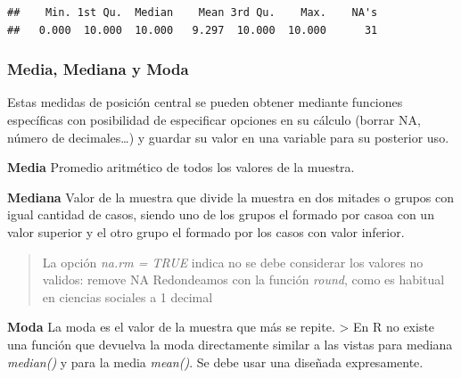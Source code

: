 \documentclass[
]{article}
\newenvironment{Shaded}{\begin{snugshade}}{\end{snugshade}}
\newcommand{\AttributeTok}[1]{\textcolor[rgb]{0.13,0.29,0.53}{#1}}
\newcommand{\ConstantTok}[1]{\textcolor[rgb]{0.56,0.35,0.01}{#1}}
\newcommand{\DecValTok}[1]{\textcolor[rgb]{0.00,0.00,0.81}{#1}}
\newcommand{\FunctionTok}[1]{\textcolor[rgb]{0.13,0.29,0.53}{\textbf{#1}}}
\newcommand{\NormalTok}[1]{#1}
\newcommand{\OtherTok}[1]{\textcolor[rgb]{0.56,0.35,0.01}{#1}}
\newcommand{\SpecialCharTok}[1]{\textcolor[rgb]{0.81,0.36,0.00}{\textbf{#1}}}
\begin{document}
\begin{verbatim}
##    Min. 1st Qu.  Median    Mean 3rd Qu.    Max.    NA's 
##   0.000  10.000  10.000   9.297  10.000  10.000      31
\end{verbatim}

\hypertarget{media-mediana-y-moda}{%
\subsubsection{Media, Mediana y Moda}\label{media-mediana-y-moda}}

Estas medidas de posición central se pueden obtener mediante funciones
específicas con posibilidad de especificar opciones en su cálculo
(borrar NA, número de decimales\ldots) y guardar su valor en una
variable para su posterior uso.

\textbf{Media} Promedio aritmético de todos los valores de la muestra.

\begin{Shaded}
\end{Shaded}

\textbf{Mediana} Valor de la muestra que divide la muestra en dos
mitades o grupos con igual cantidad de casos, siendo uno de los grupos
el formado por casoa con un valor superior y el otro grupo el formado
por los casos con valor inferior.

\begin{Shaded}
\end{Shaded}

\begin{quote}
La opción \emph{na.rm = TRUE} indica no se debe considerar los valores
no validos: remove NA Redondeamos con la función \emph{round}, como es
habitual en ciencias sociales a 1 decimal
\end{quote}

\textbf{Moda} La moda es el valor de la muestra que más se repite.
\textgreater{} En R no existe una función que devuelva la moda
directamente similar a las vistas para mediana \emph{median()} y para la
media \emph{mean()}. Se debe usar una diseñada expresamente.
\end{document}
